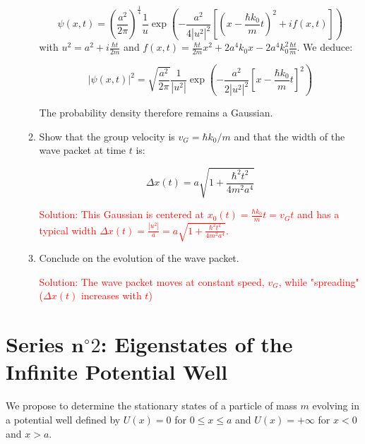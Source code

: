 \documentclass{article}
\begin{document}
\begin{enumerate}
\begin{enumerate}
{        $$
        \psi(x, t) = \left(\frac{a^{2}}{2 \pi}\right)^{\frac{1}{4}} \frac{1}{u} \exp \left(-\frac{a^{2}}{4\left|u^{2}\right|^{2}}\left[\left(x - \frac{\hbar k_{0}}{m} t\right)^{2} + i f(x, t)\right]\right)
        $$
        with $u^{2} = a^{2} + i \frac{\hbar t}{2 m}$ and $f(x, t) = \frac{\hbar t}{2 m} x^{2} + 2 a^{4} k_{0} x - 2 a^{4} k_{0}^{2} \frac{\hbar t}{m}$. We deduce:

        $$
        |\psi(x, t)|^{2} = \sqrt{\frac{a^{2}}{2 \pi}} \frac{1}{\left|u^{2}\right|} \exp \left(-\frac{a^{2}}{2\left|u^{2}\right|^{2}}\left[x - \frac{\hbar k_{0}}{m} t\right]^{2}\right)
        $$

        The probability density therefore remains a Gaussian.}

        \item Show that the group velocity is $v_{G} = \hbar k_{0} / m$ and that the width of the wave packet at time $t$ is:

        $$
        \Delta x(t) = a \sqrt{1 + \frac{\hbar^{2} t^{2}}{4 m^{2} a^{4}}}
        $$

        \textcolor{red}{Solution: This Gaussian is centered at $x_{0}(t) = \frac{\hbar k_{0}}{m} t = v_{G} t$ and has a typical width $\Delta x(t) = \frac{\left|u^{2}\right|}{a} = a \sqrt{1 + \frac{\hbar^{2} t^{2}}{4 m^{2} a^{4}}}$.}

        \item Conclude on the evolution of the wave packet.

        \textcolor{red}{Solution: The wave packet moves at constant speed, $v_{G}$, while "spreading" ($\Delta x(t)$ increases with $t$)}
    \end{enumerate}
\end{enumerate}

\newpage

\section*{Series $\mathbf{n}^{\circ} 2$: Eigenstates of the Infinite Potential Well}

We propose to determine the stationary states of a particle of mass $m$ evolving in a potential well defined by $U(x) = 0$ for $0 \leq x \leq a$ and $U(x) = +\infty$ for $x < 0$ and $x > a$.
\end{document}
